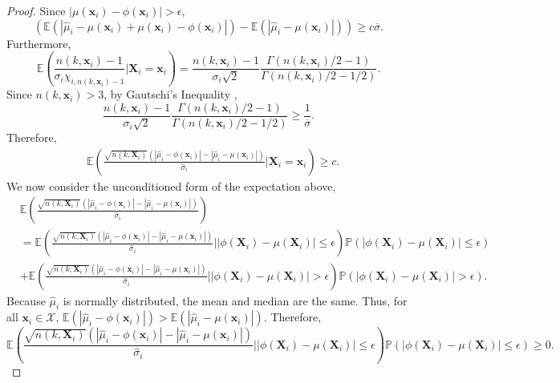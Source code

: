 \documentclass[12pt]{article}
\newcommand{\spa}[1]{\text{{$\mathcal{#1}$}}}
\newcommand{\des}{\ensuremath{\bm{x}}}
\newcommand{\desCap}{\ensuremath{\bm{X}}}
\begin{document}
\begin{proof}
    Since $|\mu(\des_i)-\phi(\des_i)|>\epsilon$,
    $$\left (\mathbb{E}\left (|\hat{\mu}_i-\mu(\des_i)+\mu(\des_i)-\phi(\des_i)|\right )-\mathbb{E}\left (|\hat{\mu}_i-\mu(\des_i)|\right ) \right )\geq c\overline{\sigma}.$$
    Furthermore,
    $$\mathbb{E}\left (\frac{n(k,\des_i)-1}{\sigma_i\chi_{i,n(k,\des_i)-1}}\Big\vert\desCap_i=\des_i\right )=\frac{n(k,\des_i)-1}{\sigma_i\sqrt{2}}\frac{\Gamma(n(k,\des_i)/2-1)}{\Gamma(n(k,\des_i)/2-1/2)}.$$
    Since $n(k,\des_i)>3$, by Gautschi's Inequality \cite{gautschi1959some},
    $$\frac{n(k,\des_i)-1}{\sigma_i\sqrt{2}}\frac{\Gamma(n(k,\des_i)/2-1)}{\Gamma(n(k,\des_i)/2-1/2)}\geq \frac{1}{\overline{\sigma}}.$$
    Therefore,
    \begin{equation*}
        \begin{split}
           &\mathbb{E}\left ( \frac{\sqrt{n(k,\desCap_i)}(|\hat{\mu}_i-\phi(\des_i)|-|\hat{\mu}_i-\mu(\des_i)|)}{\hat{\sigma}_i}\Big\vert\desCap_i=\des_i \right ) \geq c.
        \end{split}
    \end{equation*}
    We now consider the unconditioned form of the expectation above,
    \begin{equation*}
        \begin{split}
            &\mathbb{E}\left ( \frac{\sqrt{n(k,\desCap_i)}(|\hat{\mu}_i-\phi(\des_i)|-|\hat{\mu}_i-\mu(\des_i)|)}{\hat{\sigma}_i} \right )\\
            &=\mathbb{E}\left ( \frac{\sqrt{n(k,\desCap_i)}(|\hat{\mu}_i-\phi(\des_i)|-|\hat{\mu}_i-\mu(\des_i)|)}{\hat{\sigma}_i}\Big \vert |\phi(\desCap_i)-\mu(\desCap_i)|\leq \epsilon \right )\mathbb{P}\left (|\phi(\desCap_i)-\mu(\desCap_i)|\leq \epsilon \right )\\
            &+\mathbb{E}\left ( \frac{\sqrt{n(k,\desCap_i)}(|\hat{\mu}_i-\phi(\des_i)|-|\hat{\mu}_i-\mu(\des_i)|)}{\hat{\sigma}_i} \Big \vert |\phi(\desCap_i)-\mu(\desCap_i)|>\epsilon \right )\mathbb{P}\left (|\phi(\desCap_i)-\mu(\desCap_i)|>\epsilon \right ).
        \end{split}
    \end{equation*}
    Because $\hat{\mu}_i$ is normally distributed, the mean and median are the same. Thus, for all $\des_i \in \spa{X}$, $\mathbb{E}\left (|\hat{\mu}_i-\phi(\des_i)|\right )>\mathbb{E}\left (|\hat{\mu}_i-\mu(\des_i)|\right )$. Therefore,
    $$\mathbb{E}\left ( \frac{\sqrt{n(k,\desCap_i)}(|\hat{\mu}_i-\phi(\des_i)|-|\hat{\mu}_i-\mu(\des_i)|)}{\hat{\sigma}_i}\Big \vert | \phi(\desCap_i)-\mu(\desCap_i)|\leq \epsilon \right )\mathbb{P}\left (|\phi(\desCap_i)-\mu(\desCap_i)|\leq \epsilon \right )\geq 0.$$

\end{proof}
\end{document}
